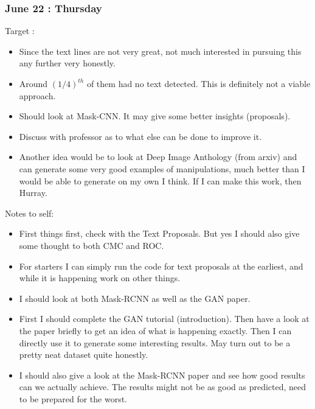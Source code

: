 \documentclass{article}
\begin{document}
\subsubsection{June 22 : Thursday}
Target :
\begin{itemize}
\item Since the text lines are not very great, not much interested in pursuing this any further very honestly.
\item Around $(1/4)^{th}$ of them had no text detected. This is definitely not a viable approach.
\item Should look at Mask-CNN. It may give some better insights (proposals).
\item Discuss with professor as to what else can be done to improve it.
\item Another idea would be to look at Deep Image Anthology (from arxiv) and can generate some very good examples of manipulations, much better than I would be able to generate on my own I think. If I can make this work, then Hurray.
\end{itemize}

Notes to self:
\begin{itemize}
\item First things first, check with the Text Proposals. But yes I should also give some thought to both CMC and ROC.
\item For starters I can simply run the code for text proposals at the earliest, and while it is happening work on other things.
\item I should look at both Mask-RCNN as well as the GAN paper.
\item First I should complete the GAN tutorial (introduction). Then have a look at the paper briefly to get an idea of what is happening exactly. Then I can directly use it to generate some interesting results. May turn out to be a pretty neat dataset quite honestly.
\item I should also give a look at the Mask-RCNN paper and see how good results can we actually achieve. The results might not be as good as predicted, need to be prepared for the worst.
\end{itemize}
\end{document}
